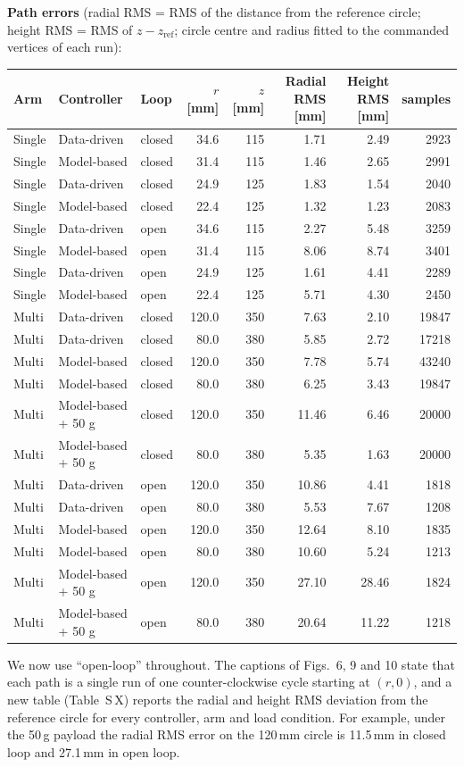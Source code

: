 \documentclass[10pt,a4paper]{article}
\begin{document}
\begin{todo}
\textbf{Path errors} (radial RMS = RMS of the distance from the reference circle; height RMS = RMS of $z-z_\text{ref}$; circle centre and radius fitted to the commanded vertices of each run):
\begin{center}\small
\begin{tabular}{lllrrrrr}
\toprule
Arm & Controller & Loop & $r$ [mm] & $z$ [mm] & Radial RMS [mm] & Height RMS [mm] & samples\\\midrule
Single & Data-driven & closed & 34.6 & 115 & 1.71 & 2.49 & 2923 \\
Single & Model-based & closed & 31.4 & 115 & 1.46 & 2.65 & 2991 \\
Single & Data-driven & closed & 24.9 & 125 & 1.83 & 1.54 & 2040 \\
Single & Model-based & closed & 22.4 & 125 & 1.32 & 1.23 & 2083 \\
Single & Data-driven & open & 34.6 & 115 & 2.27 & 5.48 & 3259 \\
Single & Model-based & open & 31.4 & 115 & 8.06 & 8.74 & 3401 \\
Single & Data-driven & open & 24.9 & 125 & 1.61 & 4.41 & 2289 \\
Single & Model-based & open & 22.4 & 125 & 5.71 & 4.30 & 2450 \\
Multi & Data-driven & closed & 120.0 & 350 & 7.63 & 2.10 & 19847 \\
Multi & Data-driven & closed & 80.0 & 380 & 5.85 & 2.72 & 17218 \\
Multi & Model-based & closed & 120.0 & 350 & 7.78 & 5.74 & 43240 \\
Multi & Model-based & closed & 80.0 & 380 & 6.25 & 3.43 & 19847 \\
Multi & Model-based + 50 g & closed & 120.0 & 350 & 11.46 & 6.46 & 20000 \\
Multi & Model-based + 50 g & closed & 80.0 & 380 & 5.35 & 1.63 & 20000 \\
Multi & Data-driven & open & 120.0 & 350 & 10.86 & 4.41 & 1818 \\
Multi & Data-driven & open & 80.0 & 380 & 5.53 & 7.67 & 1208 \\
Multi & Model-based & open & 120.0 & 350 & 12.64 & 8.10 & 1835 \\
Multi & Model-based & open & 80.0 & 380 & 10.60 & 5.24 & 1213 \\
Multi & Model-based + 50 g & open & 120.0 & 350 & 27.10 & 28.46 & 1824 \\
Multi & Model-based + 50 g & open & 80.0 & 380 & 20.64 & 11.22 & 1218 \\
\bottomrule
\end{tabular}
\end{center}
\end{todo}
\begin{resp}
We now use ``open-loop'' throughout. The captions of Figs.~6, 9 and 10 state that each path is a single run of one counter-clockwise cycle starting at $(r,0)$, and a new table (Table~S\,X) reports the radial and height RMS deviation from the reference circle for every controller, arm and load condition. For example, under the 50\,g payload the radial RMS error on the 120\,mm circle is 11.5\,mm in closed loop and 27.1\,mm in open loop.
\end{resp}
\end{document}
